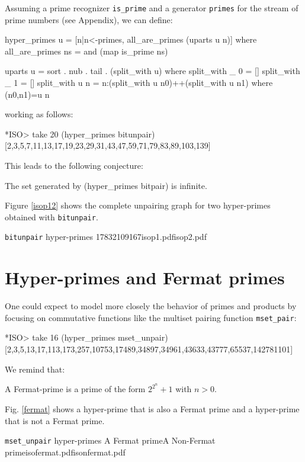 \documentclass[]{INCLUDES/llncs}
\begin{document}
Assuming a prime recognizer {\tt is\_prime} and a generator {\tt primes} 
for the stream of prime numbers (see Appendix), we can define:
\begin{code}
hyper_primes u = [n|n<-primes, all_are_primes (uparts u n)] where
  all_are_primes ns = and (map is_prime ns)
  
uparts u = sort . nub . tail . (split_with u) where
    split_with _ 0 = []
    split_with _ 1 = []
    split_with u n = n:(split_with u n0)++(split_with u n1) where
      (n0,n1)=u n  
\end{code}
working as follows:
\begin{codex}
*ISO> take 20 (hyper_primes bitunpair)
[2,3,5,7,11,13,17,19,23,29,31,43,47,59,71,79,83,89,103,139]
\end{codex}
This leads to the following conjecture:
\begin{conj}
The set generated by (hyper\_primes bitpair)
is infinite.
\end{conj}

Figure \ref{isop12} %
shows the complete unpairing graph for two
hyper-primes obtained with {\tt bitunpair}.


{{\tt bitunpair} hyper-primes}
{1783}{2109167}{isop1.pdf}{isop2.pdf}

\section{Hyper-primes and Fermat primes}
One could expect to model more closely the behavior of primes and products by
focusing on commutative functions like the multiset pairing function
{\tt mset\_pair}:
\begin{codex}
*ISO> take 16 (hyper_primes mset_unpair)
[2,3,5,13,17,113,173,257,10753,17489,34897,34961,43633,43777,65537,142781101]
\end{codex}
We remind that:
\begin{df}
A Fermat-prime is \cite{Riesel63,Keller83} a prime of the form $2^{2^n}+1$ with
$n>0$.
\end{df}
Fig. \ref{fermat} shows a hyper-prime that is also a Fermat prime
and a hyper-prime that is not a Fermat prime.

{{\tt mset\_unpair} hyper-primes}
{A Fermat prime}{A Non-Fermat prime}{isofermat.pdf}{isonfermat.pdf}
\end{document}
